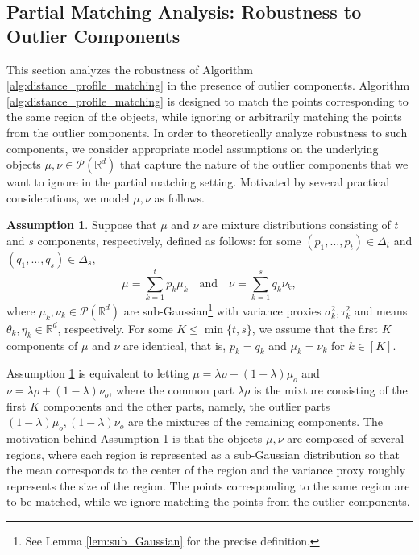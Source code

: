 \documentclass[11pt,letterpaper]{article}
\theoremstyle{definition}
\newtheorem{assumption}{Assumption}
\numberwithin{equation}{section}
\newcommand{\R}{\mathbb{R}}
\begin{document}
\subsection{Partial Matching Analysis: Robustness to Outlier Components}
\label{sec:outlier_robustness}
This section analyzes the robustness of Algorithm \ref{alg:distance_profile_matching} in the presence of outlier components. Algorithm \ref{alg:distance_profile_matching} is designed to match the points corresponding to the same region of the objects, while ignoring or arbitrarily matching the points from the outlier components. In order to theoretically analyze robustness to such components, we consider appropriate model assumptions on the underlying objects $\mu, \nu \in \mathscr{P}(\R^d)$ that capture the nature of the outlier components that we want to ignore in the partial matching setting. Motivated by several practical considerations, we model $\mu, \nu$ as follows.

\begin{assumption}
    \label{a:mixture}
    Suppose that $\mu$ and $\nu$ are mixture distributions consisting of $t$ and $s$ components, respectively, defined as follows: for some $(p_1, \ldots, p_t) \in \Delta_t$ and $(q_1, \ldots, q_s) \in \Delta_s$, 
    \begin{equation*}
        \mu = \sum_{k = 1}^{t} p_k \mu_k \quad \text{and} \quad \nu = \sum_{k = 1}^{s} q_k \nu_k,
    \end{equation*}
    where $\mu_k, \nu_k \in \mathscr{P}(\R^d)$ are sub-Gaussian\footnote{See Lemma \ref{lem:sub_Gaussian} for the precise definition.} with variance proxies $\sigma_k^2, \tau_k^2$ and means $\theta_k, \eta_k \in \R^d$, respectively. For some $K \le \min\{t, s\}$, we assume that the first $K$ components of $\mu$ and $\nu$ are identical, that is, $p_k = q_k$ and $\mu_k = \nu_k$ for $k \in [K]$.
\end{assumption}

Assumption \ref{a:mixture} is equivalent to letting $\mu = \lambda \rho + (1 - \lambda) \mu_o$ and $\nu = \lambda \rho + (1 - \lambda) \nu_o$, where the common part $\lambda \rho$ is the mixture consisting of the first $K$ components and the other parts, namely, the outlier parts $(1 - \lambda) \mu_o, (1 - \lambda) \nu_o$ are the mixtures of the remaining components. The motivation behind Assumption \ref{a:mixture} is that the objects $\mu, \nu$ are composed of several regions, where each region is represented as a sub-Gaussian distribution so that the mean corresponds to the center of the region and the variance proxy roughly represents the size of the region. The points corresponding to the same region are to be matched, while we ignore matching the points from the outlier components. 
\end{document}
